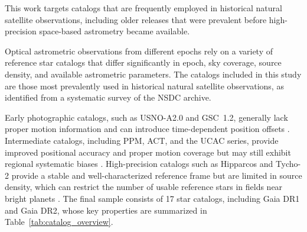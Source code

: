 \documentclass[linenumbers,amsmath,manuscript]{aastex702}
\begin{document}
This work targets catalogs that are frequently employed in historical natural satellite observations, including older releases that were prevalent before high-precision space-based astrometry became available.

Optical astrometric observations from different epochs rely on a variety of reference star catalogs that differ significantly in epoch, sky coverage, source density, and available astrometric parameters. The catalogs included in this study are those most prevalently used in historical natural satellite observations, as identified from a systematic survey of the NSDC archive.

Early photographic catalogs, such as USNO-A2.0 and GSC~1.2, generally lack proper motion information and can introduce time-dependent position offsets \citep{Monet1998USNOA2,Morrison2001GSC12}. Intermediate catalogs, including PPM, ACT, and the UCAC series, provide improved positional accuracy and proper motion coverage but may still exhibit regional systematic biases \citep{Roeser1991PPM,Urban1998ACT,Zacharias2004UCAC2,Zacharias2013UCAC4}. High-precision catalogs such as Hipparcos and Tycho-2 provide a stable and well-characterized reference frame but are limited in source density, which can restrict the number of usable reference stars in fields near bright planets \citep{ESA1997Hipparcos,Hog2000Tycho2}. The final sample consists of 17 star catalogs, including Gaia DR1 and Gaia DR2, whose key properties are summarized in Table~\ref{tab:catalog_overview}.
\end{document}
